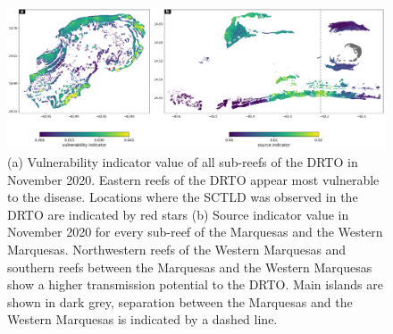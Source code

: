 \begin{figure}
    \centering
    \includegraphics[width=\textwidth]{chapters/drto/figures/fig4.png}
    \caption{ (a) Vulnerability indicator value of all sub-reefs of the DRTO in November 2020. Eastern reefs of the DRTO appear most vulnerable to the disease. Locations where the SCTLD was observed in the DRTO are indicated by red stars (b) Source indicator value in November 2020 for every sub-reef of the Marquesas and the Western Marquesas. Northwestern reefs of the Western Marquesas and southern reefs between the Marquesas and the Western Marquesas show a higher transmission potential to the DRTO. Main islands are shown in dark grey, separation between the Marquesas and the Western Marquesas is indicated by a dashed line.}
    \label{fig:fig4_drto}
\end{figure}



